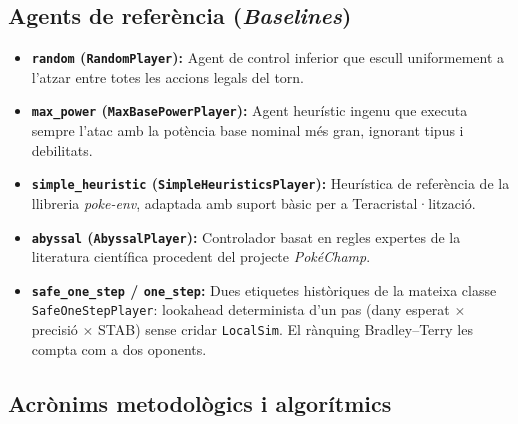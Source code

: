 \subsection{Agents de referència (\emph{Baselines})}

\begin{itemize}
    \item \textbf{\texttt{random} (\texttt{RandomPlayer}):} Agent de control inferior que escull uniformement a l'atzar entre totes les accions legals del torn.
    \item \textbf{\texttt{max\_power} (\texttt{MaxBasePowerPlayer}):} Agent heurístic ingenu que executa sempre l'atac amb la potència base nominal més gran, ignorant tipus i debilitats.
    \item \textbf{\texttt{simple\_heuristic} (\texttt{SimpleHeuristicsPlayer}):} Heurística de referència de la llibreria \textit{poke-env}, adaptada amb suport bàsic per a Teracristal·lització.
    \item \textbf{\texttt{abyssal} (\texttt{AbyssalPlayer}):} Controlador basat en regles expertes de la literatura científica procedent del projecte \textit{PokéChamp}.
    \item \textbf{\texttt{safe\_one\_step} / \texttt{one\_step}:} Dues etiquetes històriques de la mateixa classe \texttt{SafeOneStepPlayer}: lookahead determinista d'un pas (dany esperat $\times$ precisió $\times$ STAB) sense cridar \texttt{LocalSim}. El rànquing Bradley--Terry les compta com a dos oponents.
\end{itemize}

\subsection{Acrònims metodològics i algorítmics}

